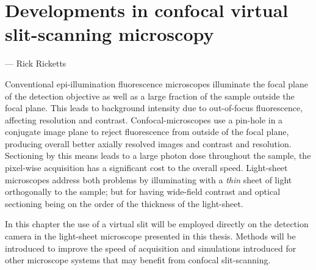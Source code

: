 \ifpdf
    \graphicspath{{Chapters/dualslit/Figs/Raster/}{Chapters/dualslit/Figs/PDF/}{Chapters/dualslit/Figs/}}
\else
    \graphicspath{{Chapters/dualslit/Figs/Vector/}{Chapters/dualslit/Figs/}}
\fi

\chapter{Developments in confocal virtual \gls{slit-scanning} microscopy}\label{chapter:dualslit}

\epigraph{\emph{}}{--- Rick Ricketts}


Conventional epi-illumination fluorescence microscopes illuminate the focal plane of the detection objective as well as a large fraction of the sample outside the focal plane.
This leads to background intensity due to out-of-focus fluorescence, affecting resolution and contrast.
Confocal-microscopes use a pin-hole in a conjugate image plane to %
reject fluorescence from outside of the focal plane, producing overall better axially resolved images and contrast and resolution.
Sectioning by this means leads to a large photon dose throughout the sample, the pixel-wise acquisition has a significant cost to the overall speed.
Light-sheet microscopes address both problems by illuminating with a \emph{thin} sheet of light orthogonally to the sample; but for having wide-field contrast and optical sectioning being on the order of the thickness of the light-sheet.

In this chapter the use of a virtual slit will be employed directly on the detection camera in the \gls{light-sheet} microscope presented in this thesis.
Methods will be introduced to improve the speed of acquisition and simulations introduced for other microscope systems that may benefit from confocal \gls{slit-scanning}.

